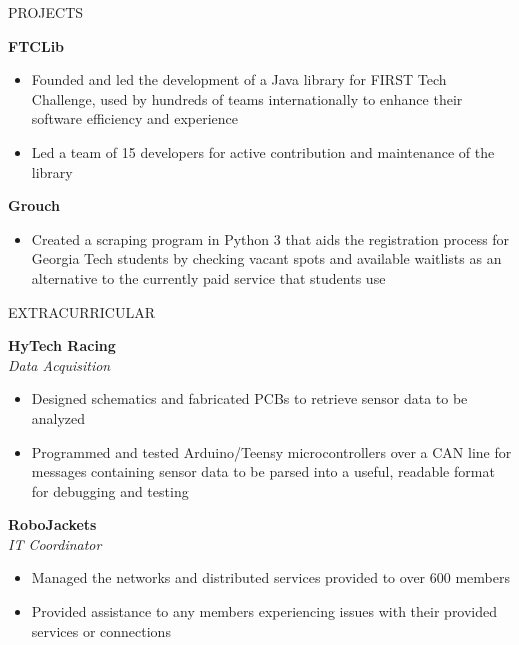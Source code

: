 \documentclass{resume} %
\begin{document}
\vspace{-0.8em}
\begin{rSection}{PROJECTS}
\vspace{-1.25em}
\item \textbf{FTCLib}
\vspace{-0.5em}
 \begin{itemize}
    \itemsep -5pt {} 
     \item Founded and led the development of a Java library for FIRST Tech Challenge, used by hundreds of teams internationally
     to enhance their software efficiency and experience
     \item Led a team of 15 developers for active contribution and maintenance of the library
 \end{itemize}
\vspace{-0.5em}
\item \textbf{Grouch}
\vspace{-0.5em}
 \begin{itemize}
    \itemsep -5pt {}
    \item Created a scraping program in Python 3 that aids the registration process for Georgia Tech students by
    checking vacant spots and available waitlists as an alternative to the currently paid service
    that students use
 \end{itemize}
\end{rSection}

\vspace{-0.8em}
\begin{rSection}{EXTRACURRICULAR}
\vspace{-1.25em}
\item \textbf{HyTech Racing}\\
\textit{Data Acquisition}
\vspace{-0.5em}
 \begin{itemize}
    \itemsep -5pt {} 
    \item Designed schematics and fabricated PCBs to retrieve sensor data to be analyzed
    \item Programmed and tested Arduino/Teensy microcontrollers over a CAN line for
    messages containing sensor data to be parsed into a useful, readable format for debugging and testing
 \end{itemize}
\vspace{-0.5em}
\item \textbf{RoboJackets}\\
\textit{IT Coordinator}
\vspace{-0.5em}
 \begin{itemize}
    \itemsep -5pt {} 
    \item Managed the networks and distributed services provided to over 600 members
    \item Provided assistance to any members experiencing issues with their provided services or connections
 \end{itemize}
\end{rSection}
\end{document}
